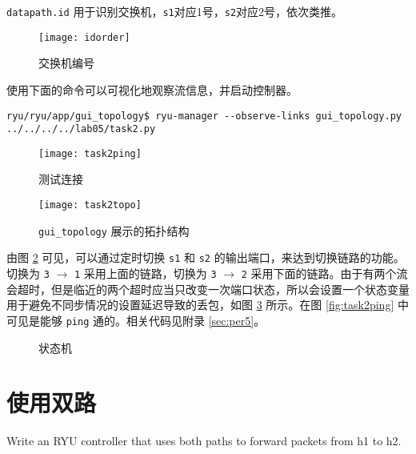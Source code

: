 
    \verb"datapath.id" 用于识别交换机，\verb"s1"对应1号，\verb"s2"对应2号，依次类推。

    \begin{figure}[H]
        \centering
        \texttt{[image: idorder]}
        \caption{交换机编号}\label{fig:idorder}
    \end{figure}

    使用下面的命令可以可视化地观察流信息\cite{gui}，并启动控制器。
    \begin{lstlisting}[style=commandshell]
        ryu/ryu/app/gui_topology$ ryu-manager --observe-links gui_topology.py ../../../../lab05/task2.py\end{lstlisting}

    \begin{figure}[H]
        \centering
        \begin{minipage}{0.48\textwidth}
            \centering
            \texttt{[image: task2ping]}
            \caption{测试连接}\label{fig:task2ping}
        \end{minipage}
        \begin{minipage}{0.48\textwidth}
            \centering
            \texttt{[image: task2topo]}
            \caption{\texttt{gui\_topology} 展示的拓扑结构}\label{fig:task2topo}
        \end{minipage}
    \end{figure}

    由图 \ref{fig:task2topo} 可见，可以通过定时切换 \verb"s1" 和 \verb"s2" 的输出端口，来达到切换链路的功能。切换为 \verb"3" $\rightarrow$ \verb"1" 采用上面的链路，切换为 \verb"3" $\rightarrow$ \verb"2" 采用下面的链路。由于有两个流会超时，但是临近的两个超时应当只改变一次端口状态，所以会设置一个状态变量用于避免不同步情况的设置延迟导致的丢包，如图 \ref{fig:pathstate} 所示。在图 \ref{fig:task2ping} 中可见是能够 \verb"ping" 通的。相关代码见附录 \ref{sec:per5}。

    \begin{figure}[H]
        \centering
        
        \caption{状态机}\label{fig:pathstate}
    \end{figure}

    \section{使用双路}
    Write an RYU controller that uses both paths to forward packets from h1 to h2.

